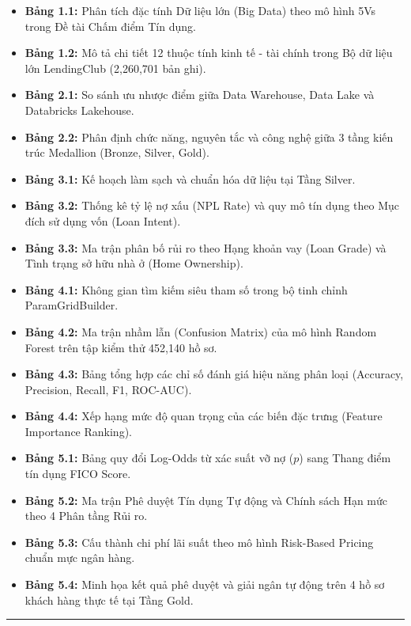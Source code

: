 \documentclass[
  13pt,
  a4paper,
]{report}
\providecommand{\tightlist}{%
  \setlength{\itemsep}{0pt}\setlength{\parskip}{0pt}}
\begin{document}
\begin{itemize}
\tightlist
\item
  \textbf{Bảng 1.1:} Phân tích đặc tính Dữ liệu lớn (Big Data) theo mô
  hình 5Vs trong Đề tài Chấm điểm Tín dụng.
\item
  \textbf{Bảng 1.2:} Mô tả chi tiết 12 thuộc tính kinh tế - tài chính
  trong Bộ dữ liệu lớn LendingClub (2,260,701 bản ghi).
\item
  \textbf{Bảng 2.1:} So sánh ưu nhược điểm giữa Data Warehouse, Data
  Lake và Databricks Lakehouse.
\item
  \textbf{Bảng 2.2:} Phân định chức năng, nguyên tắc và công nghệ giữa 3
  tầng kiến trúc Medallion (Bronze, Silver, Gold).
\item
  \textbf{Bảng 3.1:} Kế hoạch làm sạch và chuẩn hóa dữ liệu tại Tầng
  Silver.
\item
  \textbf{Bảng 3.2:} Thống kê tỷ lệ nợ xấu (NPL Rate) và quy mô tín dụng
  theo Mục đích sử dụng vốn (Loan Intent).
\item
  \textbf{Bảng 3.3:} Ma trận phân bố rủi ro theo Hạng khoản vay (Loan
  Grade) và Tình trạng sở hữu nhà ở (Home Ownership).
\item
  \textbf{Bảng 4.1:} Không gian tìm kiếm siêu tham số trong bộ tinh
  chỉnh ParamGridBuilder.
\item
  \textbf{Bảng 4.2:} Ma trận nhầm lẫn (Confusion Matrix) của mô hình
  Random Forest trên tập kiểm thử 452,140 hồ sơ.
\item
  \textbf{Bảng 4.3:} Bảng tổng hợp các chỉ số đánh giá hiệu năng phân
  loại (Accuracy, Precision, Recall, F1, ROC-AUC).
\item
  \textbf{Bảng 4.4:} Xếp hạng mức độ quan trọng của các biến đặc trưng
  (Feature Importance Ranking).
\item
  \textbf{Bảng 5.1:} Bảng quy đổi Log-Odds từ xác suất vỡ nợ (\(p\))
  sang Thang điểm tín dụng FICO Score.
\item
  \textbf{Bảng 5.2:} Ma trận Phê duyệt Tín dụng Tự động và Chính sách
  Hạn mức theo 4 Phân tầng Rủi ro.
\item
  \textbf{Bảng 5.3:} Cấu thành chi phí lãi suất theo mô hình Risk-Based
  Pricing chuẩn mực ngân hàng.
\item
  \textbf{Bảng 5.4:} Minh họa kết quả phê duyệt và giải ngân tự động
  trên 4 hồ sơ khách hàng thực tế tại Tầng Gold.
\end{itemize}

\newpage

\begin{center}\rule{0.5\linewidth}{0.5pt}\end{center}
\end{document}
